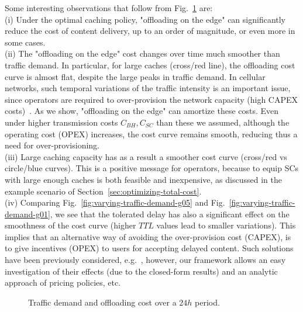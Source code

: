 \documentclass[10pt,conference,letterpaper]{IEEEtran}
\begin{document}
\noindent Some interesting observations that follow from Fig.~\ref{fig:varying-traffic-demand} are: \\
(i) Under the optimal caching policy, "offloading on the edge" can significantly reduce the cost of content delivery, up to an order of magnitude, or even more in some cases. \\
(ii) The "offloading on the edge" cost changes over time much smoother than traffic demand. In particular, for large caches (cross/red line), the offloading cost curve is almost flat, despite the large peaks in traffic demand. In cellular networks, such temporal variations of the traffic intensity is an important issue, since operators are required to over-provision the network capacity (high CAPEX costs)~\cite{tube}. As we show, "offloading on the edge" can amortize these costs. Even under higher transmission costs $C_{BH}, C_{SC}$ than these we assumed, although the operating cost (OPEX) increases, the cost curve remains smooth, reducing thus a need for over-provisioning. \\
(iii) Large caching capacity has as a result a smoother cost curve (cross/red vs circle/blue curves). This is a positive message for operators, because to equip SCs with large enough caches is both feasible and inexpensive, as discussed in the example scenario of Section~\ref{sec:optimizing-total-cost}. \\
(iv) Comparing Fig.~\ref{fig:varying-traffic-demand-g05} and Fig.~\ref{fig:varying-traffic-demand-g01}, we see that the tolerated delay has also a significant effect on the smoothness of the cost curve (higher $TTL$ values lead to smaller variations). This implies that an alternative way of avoiding the over-provision cost (CAPEX), is to give incentives (OPEX) to users for accepting delayed content. Such solutions have been previously considered, e.g.~\cite{tube}, however, our framework allows an easy investigation of their effects (due to the closed-form results) and an analytic approach of pricing policies, etc.


\begin{figure}
\caption{Traffic demand and offloading cost over a $24h$ period.}\label{fig:varying-traffic-demand}
\end{figure}
\end{document}
